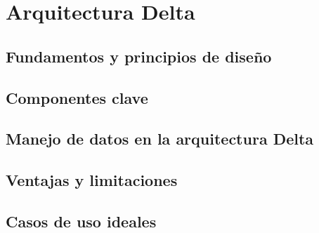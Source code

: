 \section{Arquitectura Delta}


\subsection{Fundamentos y principios de diseño}
\subsection{Componentes clave}
\subsection{Manejo de datos en la arquitectura Delta}
\subsection{Ventajas y limitaciones}
\subsection{Casos de uso ideales}